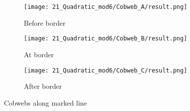 \begin{figure}
    \centering
    \begin{subfigure}{0.3\textwidth}
        \centering
        \texttt{[image: 21\_Quadratic\_mod6/Cobweb\_A/result.png]}
        \caption{Before border}
        \label{fig:quad.full.CobwebA}
    \end{subfigure}
    \begin{subfigure}{0.3\textwidth}
        \centering
        \texttt{[image: 21\_Quadratic\_mod6/Cobweb\_B/result.png]}
        \caption{At border}
        \label{fig:quad.full.CobwebB}
    \end{subfigure}
    \begin{subfigure}{0.3\textwidth}
        \centering
        \texttt{[image: 21\_Quadratic\_mod6/Cobweb\_C/result.png]}
        \caption{After border}
        \label{fig:quad.full.CobwebC}
    \end{subfigure}
    \caption{Cobwebs along marked line}
    \label{fig:quad.full.Cobwebs}
\end{figure}

